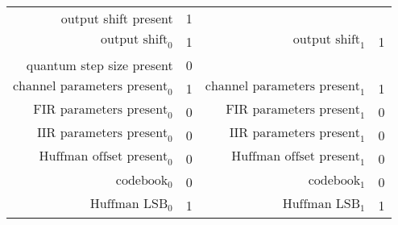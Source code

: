 \begin{table}[h]
{\begin{tabular}{rlrl}
    \hline
    output shift present & 1 \\
    $\text{output shift}_0$ & 1 &
    $\text{output shift}_1$ & 1 \\
    \hline
    quantum step size present & 0 \\
    \hline
    $\text{channel parameters present}_0$ & 1 &
    $\text{channel parameters present}_1$ & 1 \\
    $\text{FIR parameters present}_0$ & 0 &
    $\text{FIR parameters present}_1$ & 0 \\
    $\text{IIR parameters present}_0$ & 0 &
    $\text{IIR parameters present}_1$ & 0 \\
    $\text{Huffman offset present}_0$ & 0 &
    $\text{Huffman offset present}_1$ & 0 \\
    $\text{codebook}_0$ & 0 &
    $\text{codebook}_1$ & 0 \\
    $\text{Huffman LSB}_0$ & 1 &
    $\text{Huffman LSB}_1$ & 1 \\
    \hline
  \end{tabular}
}
\end{table}

\clearpage

